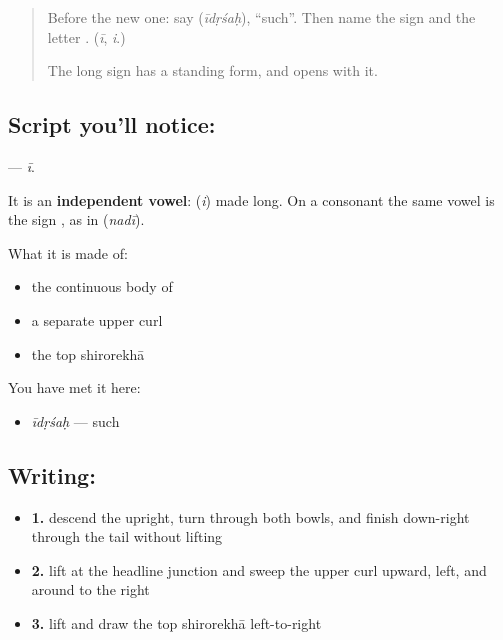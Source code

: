\label{lesson:SA-S229-letter-ii}



\begin{quote}
Before the new one: say \textbf{} (\emph{īdṛśaḥ}), \textquotedblleft{}such\textquotedblright{}. Then name the sign \textbf{} and the letter \textbf{}. (\emph{ī}, \emph{i}.)

The long sign \textbf{} has a standing form, and \textbf{} opens with it.
\end{quote}

\subsection*{Script you'll notice: }
\textbf{} — \emph{ī}.

It is an \textbf{independent vowel}: \textbf{} (\emph{i}) made long. On a consonant the same vowel is the sign \textbf{}, as in \textbf{} (\emph{nadī}).

What it is made of:

\begin{itemize}
\raggedright
  \item the continuous body of 
  \item a separate upper curl
  \item the top shirorekhā
\end{itemize}

You have met it here:

\begin{itemize}
\raggedright
  \item \textbf{} \emph{īdṛśaḥ} — such
\end{itemize}

\subsection*{Writing: }

\begin{itemize}
\raggedright
  \item \textbf{1.} descend the upright, turn through both bowls, and finish down-right through the tail without lifting
  \item \textbf{2.} lift at the headline junction and sweep the upper curl upward, left, and around to the right
  \item \textbf{3.} lift and draw the top shirorekhā left-to-right
\end{itemize}

